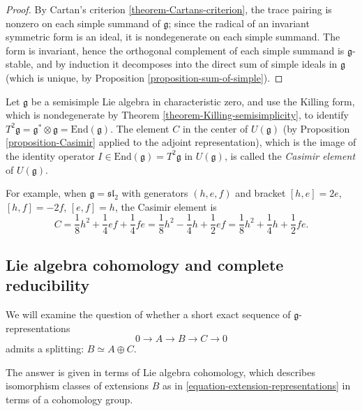 \begin{proof}
 By Cartan's criterion \ref{theorem-Cartans-criterion}, the trace pairing is nonzero on each simple summand of $\mathfrak g$; since the radical of an invariant symmetric form is an ideal, it is nondegenerate on each simple summand. The form is invariant, hence the orthogonal complement of each simple summand is $\mathfrak g$-stable, and by induction it decomposes into the direct sum of simple ideals in $\mathfrak g$ (which is unique, by Proposition \ref{proposition-sum-of-simple}).
\end{proof}




\begin{definition}
 \label{definition-Casimir}
Let $\mathfrak g$ be a semisimple Lie algebra in characteristic zero, and use the Killing form, which is nondegenerate by Theorem \ref{theorem-Killing-semisimplicity}, to identify $T^2\mathfrak g = \mathfrak g^*\otimes \mathfrak g = \text{End}(\mathfrak g)$. The element $C$ in the center of $U(\mathfrak g)$ (by Proposition \ref{proposition-Casimir} applied to the adjoint representation), which is the image of the identity operator 
$ I \in \text{End}(\mathfrak g) = T^2 \mathfrak g$ in $U(\mathfrak g)$,
is called the {\it Casimir element} of $U(\mathfrak g)$.
\end{definition}

For example, when $\mathfrak g = \mathfrak{sl}_2$ with generators $(h,e,f)$ and bracket $[h,e]=2e$, $[h,f]=-2f$, $[e,f]=h$, the Casimir element is 
$$ C = \frac{1}{8} h^2 + \frac{1}{4} ef + \frac{1}{4} fe = \frac{1}{8} h^2 - \frac{1}{4} h + \frac{1}{2} ef = \frac{1}{8} h^2 + \frac{1}{4} h + \frac{1}{2} fe.$$



\subsection{Lie algebra cohomology and complete reducibility}
\label{subsection-complete-reducibility}

We will examine the question of whether a short exact sequence of $\mathfrak g$-representations 
\begin{equation}
\label{equation-extension-representations}
0\to A\to B\to C\to 0 
\end{equation}
admits a splitting: $B\simeq A\oplus C$. 

The answer is given in terms of Lie algebra cohomology, which describes isomorphism classes of extensions $B$ as in \eqref{equation-extension-representations} in terms of a cohomology group.

